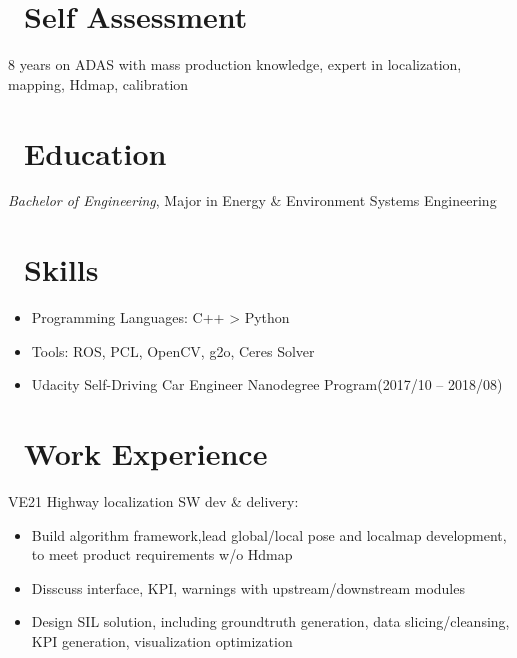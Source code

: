 \documentclass{resume}
\begin{document}



\section{\faGraduationCap\ Self Assessment}
8 years on ADAS with mass production knowledge, expert in localization, mapping, Hdmap, calibration

\section{\faGraduationCap\ Education}
\textit{Bachelor of Engineering}, Major in Energy \& Environment Systems Engineering

\section{\faCogs\ Skills}
\begin{itemize}[parsep=0.5ex]
  \item Programming Languages: C++ > Python
  \item Tools: ROS, PCL, OpenCV, g2o, Ceres Solver
  \item Udacity Self-Driving Car Engineer Nanodegree Program(2017/10 -- 2018/08)
\end{itemize}

\section{\faUsers\ Work Experience}
VE21 Highway localization SW dev \& delivery:
\begin{itemize}
  \item Build algorithm framework,lead global/local pose and localmap development, to meet product requirements w/o Hdmap
  \item Disscuss interface, KPI, warnings with upstream/downstream modules
  \item Design SIL solution, including groundtruth generation, data slicing/cleansing, KPI generation, visualization optimization
\end{itemize}
\end{document}
